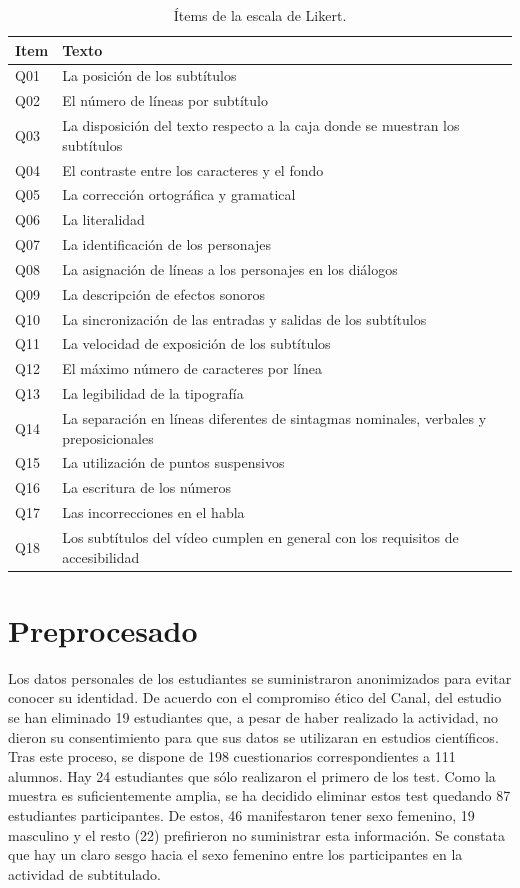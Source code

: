 \documentclass[
  12pt,
  a4paper,
  extrafontsizes,
  onecolumn,
  openright,
  table]{memoir}
\begin{document}
\hypertarget{tbl-likert-scale}{}
\begin{longtable}{ll}
\caption{\label{tbl-likert-scale}Ítems de la escala de Likert. }\tabularnewline

\toprule
Item & Texto \\ 
\midrule
Q01 & La posición de los subtítulos \\ 
Q02 & El número de líneas por subtítulo \\ 
Q03 & La disposición del texto respecto a la caja donde se muestran los subtítulos \\ 
Q04 & El contraste entre los caracteres y el fondo \\ 
Q05 & La corrección ortográfica y gramatical \\ 
Q06 & La literalidad \\ 
Q07 & La identificación de los personajes \\ 
Q08 & La asignación de líneas a los personajes en los diálogos \\ 
Q09 & La descripción de efectos sonoros \\ 
Q10 & La sincronización de las entradas y salidas de los subtítulos \\ 
Q11 & La velocidad de exposición de los subtítulos \\ 
Q12 & El máximo número de caracteres por línea \\ 
Q13 & La legibilidad de la tipografía \\ 
Q14 & La separación en líneas diferentes de sintagmas nominales, verbales y preposicionales \\ 
Q15 & La utilización de puntos suspensivos \\ 
Q16 & La escritura de los números \\ 
Q17 & Las incorrecciones en el habla \\ 
Q18 & Los subtítulos del vídeo cumplen en general con los requisitos de accesibilidad \\ 
\bottomrule
\end{longtable}

\hypertarget{sec-preprocesado}{%
\section{Preprocesado}\label{sec-preprocesado}}

Los datos personales de los estudiantes se suministraron anonimizados
para evitar conocer su identidad. De acuerdo con el compromiso ético del
Canal, del estudio se han eliminado 19 estudiantes que, a pesar de haber
realizado la actividad, no dieron su consentimiento para que sus datos
se utilizaran en estudios científicos. Tras este proceso, se dispone de
198 cuestionarios correspondientes a 111 alumnos. Hay 24 estudiantes que
sólo realizaron el primero de los test. Como la muestra es
suficientemente amplia, se ha decidido eliminar estos test quedando 87
estudiantes participantes. De estos, 46 manifestaron tener sexo
femenino, 19 masculino y el resto (22) prefirieron no suministrar esta
información. Se constata que hay un claro sesgo hacia el sexo femenino
entre los participantes en la actividad de subtitulado.
\end{document}
